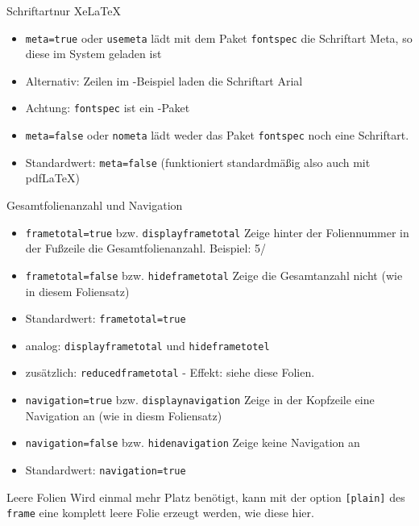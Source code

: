 \documentclass[german,10pt,xcolor=colortbl,compress
]{beamer}
\begin{document}
	\begin{frame}{Schriftart}{nur XeLaTeX}
		\begin{itemize}
			\item \lstinline|meta=true| oder \lstinline|usemeta| lädt mit dem Paket \lstinline|fontspec| die Schriftart Meta, so diese im System geladen ist
			\item Alternativ: Zeilen im \XeLaTeX-Beispiel laden die Schriftart Arial
			\item Achtung: \lstinline|fontspec| ist ein \XeLaTeX-Paket
			\item \lstinline|meta=false| oder \lstinline|nometa| lädt weder das Paket \lstinline|fontspec| noch eine Schriftart.
			\item Standardwert: \lstinline|meta=false| (funktioniert standardmäßig also auch mit pdf\LaTeX)
		\end{itemize}
	\end{frame}
	\begin{frame}{Gesamtfolienanzahl und Navigation}
		\begin{itemize}
			\item \lstinline|frametotal=true| bzw. \lstinline|displayframetotal| Zeige hinter der Foliennummer in der Fußzeile die Gesamtfolienanzahl. Beispiel: 5/\inserttotalframenumber
			\item \lstinline|frametotal=false| bzw. \lstinline|hideframetotal| Zeige die Gesamtanzahl nicht (wie in diesem Foliensatz)
			\item Standardwert: \lstinline|frametotal=true|
			\item analog: \lstinline|displayframetotal| und \lstinline|hideframetotel|
			\item zusätzlich: \lstinline|reducedframetotal| - Effekt: siehe diese Folien.
		\end{itemize}
		\vspace{\baselineskip}
		\begin{itemize}
			\item \lstinline|navigation=true| bzw. \lstinline|displaynavigation| Zeige in der Kopfzeile eine Navigation an (wie in diesm Foliensatz)
			\item \lstinline|navigation=false| bzw. \lstinline|hidenavigation| Zeige keine Navigation an
			\item Standardwert: \lstinline|navigation=true|
		\end{itemize}
	\end{frame}
	\begin{frame}[plain]{Leere Folien}
		Wird einmal mehr Platz benötigt, kann mit der option \lstinline|[plain]| des \lstinline|frame| eine komplett leere Folie erzeugt werden, wie diese hier.
	\end{frame}
\end{document}
